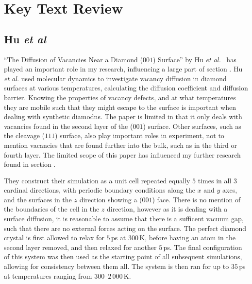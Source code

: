 \documentclass[10pt,a4paper,twocolumn,twoside]{extarticle}
\newcommand{\al}{\emph{et al. }}
\begin{document}


\section{Key Text Review}
\subsection{Hu \textit{et al}}
\label{Hu}
``The Diffusion of Vacancies Near a Diamond ($001$) Surface'' by Hu \al~has played an important role in my research, influencing a large part of section . Hu \al used molecular dynamics to investigate vacancy diffusion in diamond surfaces at various temperatures, calculating the diffusion coefficient and diffusion barrier. Knowing the properties of vacancy defects, and at what temperatures they are mobile such that they might escape to the surface is important when dealing with synthetic diamodns. The paper is limited in that it only deals with vacancies found in the second layer of the ($001$) surface. Other surfaces, such as the cleavage ($111$) surface, also play important roles in experiment, not to mention vacancies that are found further into the bulk, such as in the third or fourth layer. The limited scope of this paper has influenced my further research found in section .

They construct their simulation as a unit cell repeated equally $5$ times in all $3$ cardinal directions, with periodic boundary conditions along the $x$ and $y$ axes, and the surfaces in the $z$ direction showing a ($001$) face. There is no mention of the boundaries of the cell in the $z$ direction, however as it is dealing with a surface diffusion, it is reasonable to assume that there is a sufficent vacuum gap, such that there are no external forces acting on the surface. The perfect diamond crystal is first allowed to relax for $5$\,ps at $300$\,K, before having an atom in the second layer removed, and then relaxed for another $5$\,ps. The final configuration of this system was then used as the starting point of all subsequent simulations, allowing for consistency between them all. The system is then ran for up to $35$\,ps at temperatures ranging from $300$--$2\,000$\,K. 
\end{document}

